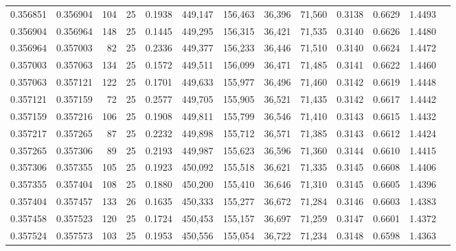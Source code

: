 \begin{tabular}{rrrrrrrrrrrrr}
0.356851 & 0.356904 &   104 &  25 &                                     0.1938 & 449,147 & 156,463 &  36,396 &  71,560 & 0.3138 & 0.6629 & 1.4493 \\
0.356904 & 0.356964 &   148 &  25 &                                     0.1445 & 449,295 & 156,315 &  36,421 &  71,535 & 0.3140 & 0.6626 & 1.4480 \\
0.356964 & 0.357003 &    82 &  25 &                                     0.2336 & 449,377 & 156,233 &  36,446 &  71,510 & 0.3140 & 0.6624 & 1.4472 \\
0.357003 & 0.357063 &   134 &  25 &                                     0.1572 & 449,511 & 156,099 &  36,471 &  71,485 & 0.3141 & 0.6622 & 1.4460 \\
0.357063 & 0.357121 &   122 &  25 &                                     0.1701 & 449,633 & 155,977 &  36,496 &  71,460 & 0.3142 & 0.6619 & 1.4448 \\
0.357121 & 0.357159 &    72 &  25 &                                     0.2577 & 449,705 & 155,905 &  36,521 &  71,435 & 0.3142 & 0.6617 & 1.4442 \\
0.357159 & 0.357216 &   106 &  25 &                                     0.1908 & 449,811 & 155,799 &  36,546 &  71,410 & 0.3143 & 0.6615 & 1.4432 \\
0.357217 & 0.357265 &    87 &  25 &                                     0.2232 & 449,898 & 155,712 &  36,571 &  71,385 & 0.3143 & 0.6612 & 1.4424 \\
0.357265 & 0.357306 &    89 &  25 &                                     0.2193 & 449,987 & 155,623 &  36,596 &  71,360 & 0.3144 & 0.6610 & 1.4415 \\
0.357306 & 0.357355 &   105 &  25 &                                     0.1923 & 450,092 & 155,518 &  36,621 &  71,335 & 0.3145 & 0.6608 & 1.4406 \\
0.357355 & 0.357404 &   108 &  25 &                                     0.1880 & 450,200 & 155,410 &  36,646 &  71,310 & 0.3145 & 0.6605 & 1.4396 \\
0.357404 & 0.357457 &   133 &  26 &                                     0.1635 & 450,333 & 155,277 &  36,672 &  71,284 & 0.3146 & 0.6603 & 1.4383 \\
0.357458 & 0.357523 &   120 &  25 &                                     0.1724 & 450,453 & 155,157 &  36,697 &  71,259 & 0.3147 & 0.6601 & 1.4372 \\
0.357524 & 0.357573 &   103 &  25 &                                     0.1953 & 450,556 & 155,054 &  36,722 &  71,234 & 0.3148 & 0.6598 & 1.4363 \\

\end{tabular}
